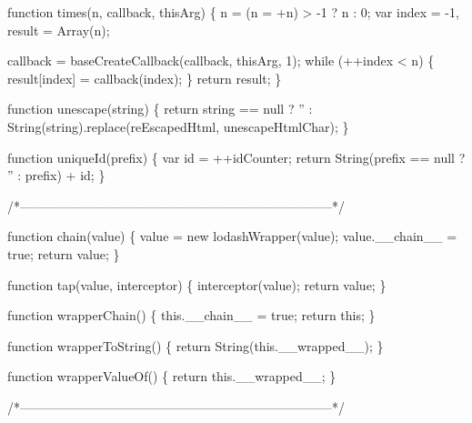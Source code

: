 \begin{DoxyCodeInclude}
    \textcolor{keyword}{function} times(n, callback, thisArg) \{
      n = (n = +n) > -1 ? n : 0;
      var index = -1,
          result = Array(n);

      callback = baseCreateCallback(callback, thisArg, 1);
      \textcolor{keywordflow}{while} (++index < n) \{
        result[index] = callback(index);
      \}
      \textcolor{keywordflow}{return} result;
    \}

    \textcolor{keyword}{function} unescape(\textcolor{keywordtype}{string}) \{
      \textcolor{keywordflow}{return} \textcolor{keywordtype}{string} == null ? \textcolor{stringliteral}{''} : String(\textcolor{keywordtype}{string}).replace(reEscapedHtml, unescapeHtmlChar);
    \}

    \textcolor{keyword}{function} uniqueId(prefix) \{
      var \textcolor{keywordtype}{id} = ++idCounter;
      \textcolor{keywordflow}{return} String(prefix == null ? \textcolor{stringliteral}{''} : prefix) + id;
    \}

    \textcolor{comment}{/*--------------------------------------------------------------------------*/}

    \textcolor{keyword}{function} chain(value) \{
      value = \textcolor{keyword}{new} lodashWrapper(value);
      value.\_\_chain\_\_ = \textcolor{keyword}{true};
      \textcolor{keywordflow}{return} value;
    \}

    \textcolor{keyword}{function} tap(value, interceptor) \{
      interceptor(value);
      \textcolor{keywordflow}{return} value;
    \}

    \textcolor{keyword}{function} wrapperChain() \{
      this.\_\_chain\_\_ = \textcolor{keyword}{true};
      \textcolor{keywordflow}{return} \textcolor{keyword}{this};
    \}

    \textcolor{keyword}{function} wrapperToString() \{
      \textcolor{keywordflow}{return} String(this.\_\_wrapped\_\_);
    \}

    \textcolor{keyword}{function} wrapperValueOf() \{
      \textcolor{keywordflow}{return} this.\_\_wrapped\_\_;
    \}

    \textcolor{comment}{/*--------------------------------------------------------------------------*/}


\end{DoxyCodeInclude}
